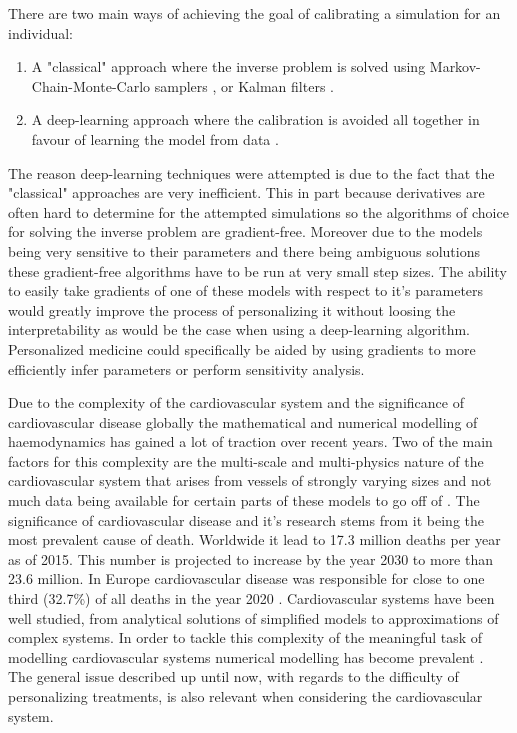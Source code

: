 \documentclass[a4paper, oneside]{discothesis}
\begin{document}
There are two main ways of achieving the goal of calibrating a simulation for an individual:
\begin{enumerate}
	\item A "classical" approach where the inverse problem is solved using Markov-Chain-Monte-Carlo samplers \cite{melis2017gaussian}, or Kalman filters \cite{manganotti2022modeling}.
	\item A deep-learning approach where the calibration is avoided all together in favour of learning the model from data \cite{kissas2020machine,arzani2022machine}.
\end{enumerate}
The reason deep-learning techniques were attempted is due to the fact that the "classical" approaches are very inefficient.
This in part because derivatives are often hard to determine for the attempted simulations so the algorithms of choice for solving the inverse problem are gradient-free. 
Moreover due to the models being very sensitive to their parameters and there being ambiguous solutions \cite{nolte2022inverse,quick2001infinite} these gradient-free algorithms have to be run at very small step sizes. \cite{taylor2009patient,tuccio2022parameter,marsden2014optimization,mineroff2019optimization,bozkurt2022patient}
The ability to easily take gradients of one of these models with respect to it's parameters would greatly improve the process of personalizing it without loosing the interpretability as would be the case when using a deep-learning algorithm.
Personalized medicine could specifically be aided by using gradients to more efficiently infer parameters or perform sensitivity analysis.

Due to the complexity of the cardiovascular system and the significance of cardiovascular disease globally the mathematical and numerical modelling of haemodynamics has gained a lot of traction over recent years.
Two of the main factors for this complexity are the multi-scale and multi-physics nature of the cardiovascular system that arises from vessels of strongly varying sizes and not much data being available for certain parts of these models to go off of \cite{quarteroni2016geometric}.
The significance of cardiovascular disease and it's research stems from it being the most prevalent cause of death.
Worldwide it lead to 17.3 million deaths per year as of 2015.
This number is projected to increase by the year 2030 to more than 23.6 million. \cite{update2015heart}
In Europe cardiovascular disease was responsible for close to one third (32.7\%) of all deaths in the year 2020 \cite{Coelho2020}.
Cardiovascular systems have been well studied, from analytical solutions of simplified models to approximations of complex systems.
In order to tackle this complexity of the meaningful task of modelling cardiovascular systems numerical modelling has become prevalent \cite{formaggia2009multiscale,quarteroni2016geometric,black2020p14,el2018investigating,qureshi2014numerical,reichold2009vascular}.
The general issue described up until now, with regards to the difficulty of personalizing treatments, is also relevant when considering the cardiovascular system.
\end{document}
